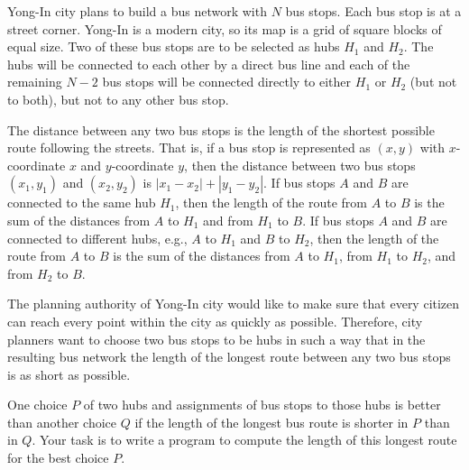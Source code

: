 Yong-In city plans to build a bus network with $N$ bus stops. Each bus stop is at a street
corner. Yong-In is a modern city, so its map is a grid of square blocks of equal size.
Two of these bus stops are to be selected as hubs $H_1$ and $H_2$. The hubs will be connected to each other by a direct bus line and each of the remaining $N - 2$ bus stops will be connected directly to either $H_1$ or $H_2$ (but not to both), but not to any other bus stop.

The distance between any two bus stops is the length of the shortest possible route
following the streets. That is, if a bus stop is represented as $(x, y)$ with $x$-coordinate $x$ and $y$-coordinate $y$, then the distance between two bus stops $(x_1, y_1)$ and $(x_2, y_2)$ is $|x_1 - x_2| + |y_1 - y_2|$. If bus stops $A$ and $B$ are connected to the same hub $H_1$, then the length of the route from $A$ to $B$ is the sum of the distances from $A$ to $H_1$ and from $H_1$ to $B$. If bus stops $A$ and $B$ are connected to different hubs, e.g., $A$ to $H_1$ and $B$ to $H_2$, then the length of the route from $A$ to $B$ is the sum of the distances from $A$ to $H_1$, from $H_1$ to $H_2$, and
from $H_2$ to $B$.

The planning authority of Yong-In city would like to make sure that every citizen can
reach every point within the city as quickly as possible. Therefore, city planners want to
choose two bus stops to be hubs in such a way that in the resulting bus network the
length of the longest route between any two bus stops is as short as possible.

One choice $P$ of two hubs and assignments of bus stops to those hubs is better than
another choice $Q$ if the length of the longest bus route is shorter in $P$ than in $Q$. Your task is to write a program to compute the length of this longest route for the best choice $P$.